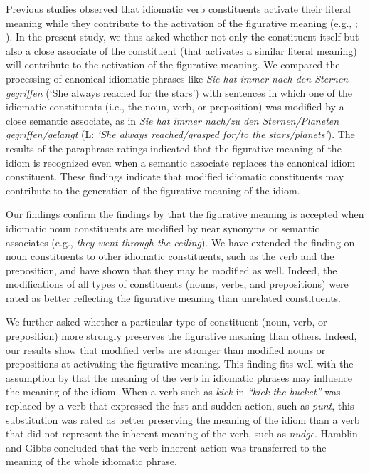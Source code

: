 Previous studies observed that idiomatic verb constituents activate their literal meaning while they contribute to the activation of the figurative meaning (e.g., \citealt{rabanus:2008}; \citealt{smolka:2007}). In the present study, we thus asked whether not only the constituent itself but also a close associate of the constituent (that activates a similar literal meaning) will contribute to the activation of the figurative meaning. We compared the processing of canonical idiomatic phrases like \textit{Sie hat immer nach den Sternen gegriffen} (‘She always reached for the stars’) with sentences in which one of the idiomatic constituents (i.e., the noun, verb, or preposition) was modified by a close semantic associate, as in \textit{Sie hat immer nach/zu den Sternen/Planeten gegriffen/gelangt} (L: \textit{‘She always reached/grasped for/to the stars/planets’}). The results of the paraphrase ratings indicated that the figurative meaning of the idiom is recognized even when a semantic associate replaces the canonical idiom constituent. These findings indicate that modified idiomatic constituents may contribute to the generation of the figurative meaning of the idiom. 

Our findings confirm the findings by \citealt{geeraert:2017} that the figurative meaning is accepted when idiomatic noun constituents are modified by near synonyms or semantic associates (e.g., \textit{they went through the ceiling}).  We have extended the finding on noun constituents to other idiomatic constituents, such as the verb and the preposition, and have shown that they may be modified as well. Indeed, the modifications of all types of constituents (nouns, verbs, and prepositions) were rated as better reflecting the figurative meaning than unrelated constituents. 

We further asked whether a particular type of constituent (noun, verb, or preposition) more strongly preserves the figurative meaning than others.  Indeed, our results show that modified verbs are stronger than modified nouns or prepositions at activating the figurative meaning. This finding fits well with the assumption by \citealt{hamblin:1999} that the meaning of the verb in idiomatic phrases may influence the meaning of the idiom. When a verb such as \textit{kick} in \textit{``kick the bucket''} was replaced by a verb that expressed the fast and sudden action, such as \textit{punt}, this substitution was rated as better preserving the meaning of the idiom than a verb that did not represent the inherent meaning of the verb, such as \textit{nudge}. Hamblin and Gibbs concluded that the verb-inherent action was transferred to the meaning of the whole idiomatic phrase.

